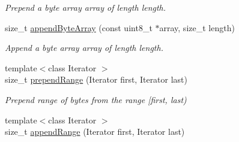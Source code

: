 \begin{DoxyCompactItemize}
\begin{DoxyCompactList}\small\item\em Prepend a byte array {\ttfamily array} of length {\ttfamily length}. \end{DoxyCompactList}\item 
size\+\_\+t \hyperlink{classndn_1_1encoding_1_1Encoder_ad974b739952dbcc71d04627516f9f84e}{append\+Byte\+Array} (const uint8\+\_\+t $\ast$array, size\+\_\+t length)\hypertarget{classndn_1_1encoding_1_1Encoder_ad974b739952dbcc71d04627516f9f84e}{}\label{classndn_1_1encoding_1_1Encoder_ad974b739952dbcc71d04627516f9f84e}

\begin{DoxyCompactList}\small\item\em Append a byte array {\ttfamily array} of length {\ttfamily length}. \end{DoxyCompactList}\item 
{\footnotesize template$<$class Iterator $>$ }\\size\+\_\+t \hyperlink{classndn_1_1encoding_1_1Encoder_a60b8a2705f34a4f63d0a0e5b5865624e}{prepend\+Range} (Iterator first, Iterator last)\hypertarget{classndn_1_1encoding_1_1Encoder_a60b8a2705f34a4f63d0a0e5b5865624e}{}\label{classndn_1_1encoding_1_1Encoder_a60b8a2705f34a4f63d0a0e5b5865624e}

\begin{DoxyCompactList}\small\item\em Prepend range of bytes from the range \mbox{[}{\ttfamily first}, {\ttfamily last}) \end{DoxyCompactList}\item 
{\footnotesize template$<$class Iterator $>$ }\\size\+\_\+t \hyperlink{classndn_1_1encoding_1_1Encoder_ac7e83ae5db018c99dfe8fd7fd8bcb914}{append\+Range} (Iterator first, Iterator last)\hypertarget{classndn_1_1encoding_1_1Encoder_ac7e83ae5db018c99dfe8fd7fd8bcb914}{}\label{classndn_1_1encoding_1_1Encoder_ac7e83ae5db018c99dfe8fd7fd8bcb914}


\end{DoxyCompactItemize}
